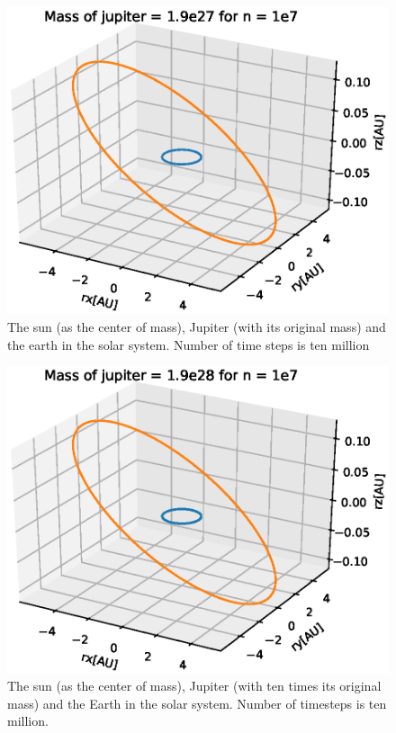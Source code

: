 \documentclass{article}
\begin{document}
\begin{figure}[H]
  \includegraphics[scale=0.5]{plots/Mass1.eps}
  \caption{The sun (as the center of mass), Jupiter (with its original mass) and the earth in the solar system. Number of time steps is ten million}
  \label{jupitermass1}
\end{figure}

\begin{figure}[H]
  \includegraphics[scale=0.5]{plots/Mass10.eps}
  \caption{The sun (as the center of mass), Jupiter (with ten times its original mass) and the Earth in the solar system. Number of timesteps is ten million.}
  \label{jupitermass10}
\end{figure}
\end{document}
